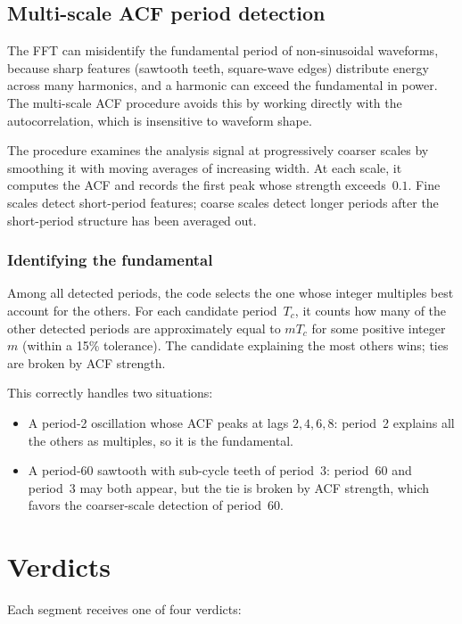 \documentclass[11pt]{article}
\begin{document}
\subsection{Multi-scale ACF period detection}
\label{sec:multiscale}

The FFT can misidentify the fundamental period of non-sinusoidal
waveforms, because sharp features (sawtooth teeth, square-wave edges)
distribute energy across many harmonics, and a harmonic can exceed the
fundamental in power.  The multi-scale ACF procedure avoids this by
working directly with the autocorrelation, which is insensitive to
waveform shape.

The procedure examines the analysis signal at progressively coarser
scales by smoothing it with moving averages of increasing width.  At each
scale, it computes the ACF and records the first peak whose strength
exceeds~$0.1$.  Fine scales detect short-period features; coarse scales
detect longer periods after the short-period structure has been averaged
out.

\subsubsection*{Identifying the fundamental}

Among all detected periods, the code selects the one whose integer
multiples best account for the others.  For each candidate period~$T_c$,
it counts how many of the other detected periods are approximately equal
to $mT_c$ for some positive integer~$m$ (within a 15\% tolerance).  The
candidate explaining the most others wins; ties are broken by ACF
strength.

This correctly handles two situations:
\begin{itemize}
\item A period-2 oscillation whose ACF peaks at lags $2, 4, 6, 8$:
  period~2 explains all the others as multiples, so it is the fundamental.
\item A period-60 sawtooth with sub-cycle teeth of period~3: period~60
  and period~3 may both appear, but the tie is broken by ACF strength,
  which favors the coarser-scale detection of period~60.
\end{itemize}

\section{Verdicts}

Each segment receives one of four verdicts:
\end{document}
